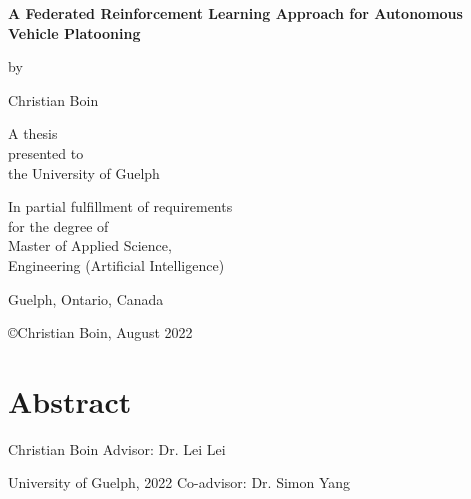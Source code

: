 \documentclass[oneside, 12pt]{book}
\begin{document}
\begin{titlepage}
	\setlength{\parskip}{12pt}
	\centering
	{\textbf{\LARGE A Federated Reinforcement Learning Approach for Autonomous Vehicle Platooning}\par}
	\vspace{1.5 cm}
	{by}\par
	\vspace{1 cm}
	{Christian Boin}\par
	\vspace{2cm}
	{A thesis\\
	presented to\\
	the University of Guelph}\par
	\vspace{2cm}
	{In partial fulfillment of requirements\\
	for the degree of\\
	Master of Applied Science,\\
	Engineering (Artificial Intelligence)}\par
	\vspace{2cm}
	{\normalsize Guelph, Ontario, Canada}\par
	\vspace{0.25cm}
	{\copyright\hspace{6pt}Christian Boin, August 2022}\par
\end{titlepage}
\chapter*{Abstract}
\noindent Christian Boin \hfill Advisor: Dr. Lei Lei


\noindent University of Guelph, 2022  \hfill Co-advisor: Dr. Simon Yang
\vspace{12pt}
\end{document}
